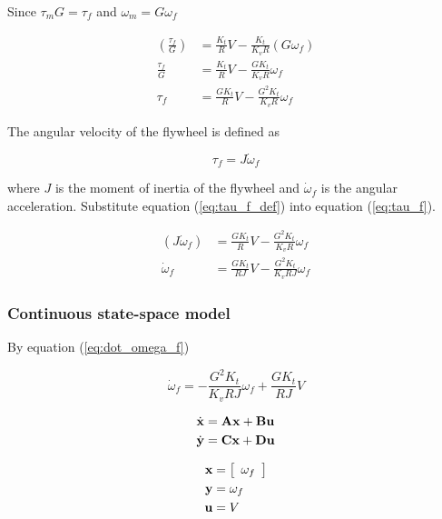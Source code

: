 Since $\tau_m G = \tau_f$ and $\omega_m = G \omega_f$

\begin{align}
  \left(\frac{\tau_f}{G}\right) &= \frac{K_t}{R} V -
    \frac{K_t}{K_v R} (G \omega_f) \nonumber \\
  \frac{\tau_f}{G} &= \frac{K_t}{R} V - \frac{G K_t}{K_v R} \omega_f \nonumber
    \\
  \tau_f &= \frac{G K_t}{R} V - \frac{G^2 K_t}{K_v R} \omega_f \label{eq:tau_f}
\end{align}

The angular velocity of the flywheel is defined as

\begin{equation}
  \tau_f = J \dot{\omega}_f \label{eq:tau_f_def}
\end{equation}

where $J$ is the moment of inertia of the flywheel and $\dot{\omega}_f$ is the
angular acceleration. Substitute equation (\ref{eq:tau_f_def}) into equation
(\ref{eq:tau_f}).

\begin{align}
  (J \dot{\omega}_f) &= \frac{G K_t}{R} V - \frac{G^2 K_t}{K_v R} \omega_f
    \nonumber \\
  \dot{\omega}_f &= \frac{G K_t}{RJ} V - \frac{G^2 K_t}{K_v RJ} \omega_f
    \label{eq:dot_omega_f}
\end{align}

\subsubsection{Continuous state-space model}

By equation (\ref{eq:dot_omega_f})

\begin{equation*}
  \dot{\omega}_f = -\frac{G^2 K_t}{K_v RJ} \omega_f + \frac{G K_t}{RJ} V
\end{equation*}

\begin{align*}
  \dot{\mathbf{x}} &= \mathbf{A} \mathbf{x} + \mathbf{B} \mathbf{u} \\
  \dot{\mathbf{y}} &= \mathbf{C} \mathbf{x} + \mathbf{D} \mathbf{u}
\end{align*}

\begin{align*}
  \mathbf{x} &= \left[
  \begin{array}{c}
    \omega_f
  \end{array}
  \right] \\
  \mathbf{y} &= \omega_f \\
  \mathbf{u} &= V
\end{align*}

